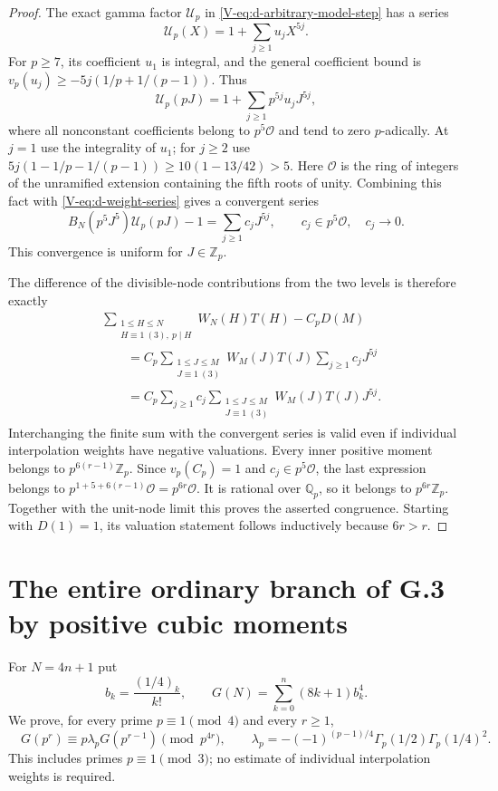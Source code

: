\documentclass[11pt,letterpaper]{article}
\numberwithin{equation}{section}
\begin{document}
\begin{proof}
The exact gamma factor $\mathcal U_p$ in
\eqref{V-eq:d-arbitrary-model-step} has a series
\[
 \mathcal U_p(X)=1+\sum_{j\ge1}u_jX^{5j}.
\]
For $p\ge7$, its coefficient $u_1$ is integral, and the general
coefficient bound is
$v_p(u_j)\ge-5j(1/p+1/(p-1))$.
Thus
\[
 \mathcal U_p(pJ)=1+\sum_{j\ge1}p^{5j}u_jJ^{5j},
\]
where all nonconstant coefficients belong to $p^5\mathcal O$ and
tend to zero $p$-adically. At $j=1$ use the integrality of $u_1$;
for $j\ge2$ use
$5j(1-1/p-1/(p-1))\ge10(1-13/42)>5$.
Here $\mathcal O$ is the ring of integers of the unramified extension
containing the fifth roots of unity. Combining this fact with
\eqref{V-eq:d-weight-series} gives a convergent series
\begin{equation}\label{V-eq:d-transport-coefficients}
 B_N(p^5J^5)\mathcal U_p(pJ)-1
 =\sum_{j\ge1}c_jJ^{5j},\qquad
 c_j\in p^5\mathcal O,\quad c_j\longrightarrow0.
\end{equation}
This convergence is uniform for $J\in\mathbb Z_p$.

The difference of the divisible-node contributions from the two
levels is therefore exactly
\begin{align*}
 &\sum_{\substack{1\le H\le N\\H\equiv1\ (3),\ p\mid H}}
 W_N(H)T(H)-C_pD(M)\\
 &\qquad=C_p\sum_{\substack{1\le J\le M\\J\equiv1\ (3)}}
 W_M(J)T(J)\sum_{j\ge1}c_jJ^{5j}\\
 &\qquad=C_p\sum_{j\ge1}c_j
 \sum_{\substack{1\le J\le M\\J\equiv1\ (3)}}W_M(J)T(J)J^{5j}.
\end{align*}
Interchanging the finite sum with the convergent series is valid
even if individual interpolation weights have negative valuations.
Every inner positive moment belongs to $p^{6(r-1)}\mathbb Z_p$.
Since $v_p(C_p)=1$ and $c_j\in p^5\mathcal O$, the last expression
belongs to $p^{1+5+6(r-1)}\mathcal O=p^{6r}\mathcal O$.
It is rational over $\mathbb Q_p$, so it belongs to
$p^{6r}\mathbb Z_p$. Together with the unit-node limit this proves
the asserted congruence. Starting with $D(1)=1$, its valuation
statement follows inductively because $6r>r$.
\end{proof}

\section{The entire ordinary branch of G.3 by positive cubic moments}\label{loc-V-7}
\label{V-sec:G6ordinary}
For $N=4n+1$ put
\[
 b_k=\frac{(1/4)_k}{k!},\qquad
 G(N)=\sum_{k=0}^{n}(8k+1)b_k^4.
\]
We prove, for every prime $p\equiv1\pmod4$ and every $r\ge1$,
\begin{equation}\label{V-G6:main}
 \boxed{\quad G(p^r)\equiv p\lambda_pG(p^{r-1})\pmod{p^{4r}},
 \qquad\lambda_p=-(-1)^{(p-1)/4}
 \Gamma_p(1/2)\Gamma_p(1/4)^2.\quad}
\end{equation}
This includes primes $p\equiv1\pmod3$; no estimate of individual
interpolation weights is required.
\end{document}
